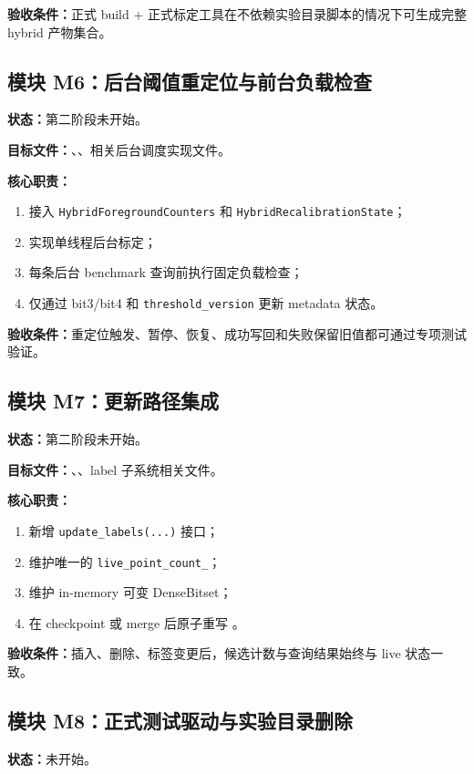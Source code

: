 \documentclass[UTF8]{ctexart}
\begin{document}
\textbf{验收条件：}正式 build + 正式标定工具在不依赖实验目录脚本的情况下可生成完整 hybrid 产物集合。

\subsection{模块 M6：后台阈值重定位与前台负载检查}
\textbf{状态：}第二阶段未开始。

\textbf{目标文件：}、、相关后台调度实现文件。

\textbf{核心职责：}

\begin{enumerate}
\item 接入 \texttt{HybridForegroundCounters} 和 \texttt{HybridRecalibrationState}；
\item 实现单线程后台标定；
\item 每条后台 benchmark 查询前执行固定负载检查；
\item 仅通过 bit3/bit4 和 \texttt{threshold\_version} 更新 metadata 状态。
\end{enumerate}

\textbf{验收条件：}重定位触发、暂停、恢复、成功写回和失败保留旧值都可通过专项测试验证。

\subsection{模块 M7：更新路径集成}
\textbf{状态：}第二阶段未开始。

\textbf{目标文件：}、、label 子系统相关文件。

\textbf{核心职责：}

\begin{enumerate}
\item 新增 \texttt{update\_labels(...)} 接口；
\item 维护唯一的 \texttt{live\_point\_count\_}；
\item 维护 in-memory 可变 DenseBitset；
\item 在 checkpoint 或 merge 后原子重写 。
\end{enumerate}

\textbf{验收条件：}插入、删除、标签变更后，候选计数与查询结果始终与 live 状态一致。

\subsection{模块 M8：正式测试驱动与实验目录删除}
\textbf{状态：}未开始。
\end{document}
